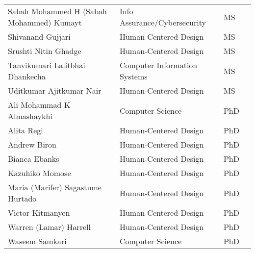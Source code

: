 \begin{table}
\begin{tabular}{| l | l | l | l }
Sabah Mohammed H (Sabah Mohammed) Kumayt& Info Assurance/Cybersecurity & MS \\
Shivanand Gujjari& Human-Centered Design & MS \\
Srushti Nitin Ghadge& Human-Centered Design & MS \\
Tanvikumari Lalitbhai Dhankecha& Computer Information Systems & MS \\
Uditkumar Ajitkumar Nair& Human-Centered Design & MS \\
Ali Mohammad K Almashaykhi& Computer Science & PhD \\
Alita Regi& Human-Centered Design & PhD \\
Andrew Biron& Human-Centered Design & PhD \\
Bianca Ebanks& Human-Centered Design & PhD \\
Kazuhiko Momose& Human-Centered Design & PhD \\
Maria (Marifer) Sagastume Hurtado& Human-Centered Design & PhD \\
Victor Kitmanyen& Human-Centered Design & PhD \\
Warren (Lamar) Harrell& Human-Centered Design & PhD \\
Waseem Samkari& Computer Science & PhD \\
\end{tabular}
\end{table}

\newpage
